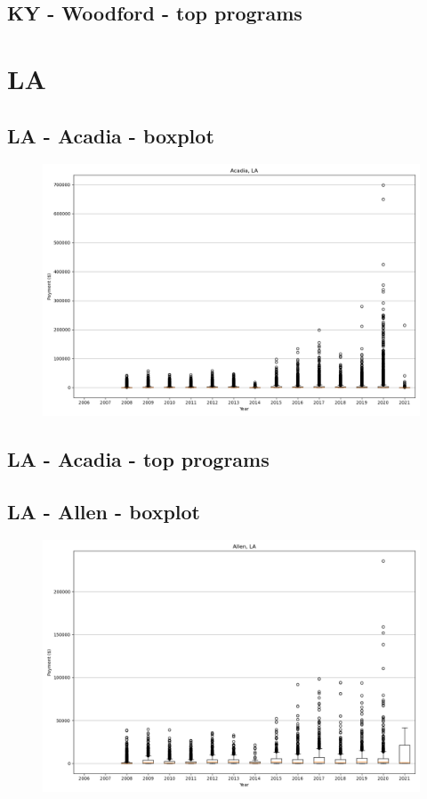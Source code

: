 \subsection*{KY - Woodford - top programs}

\newpage
\section*{LA}
\subsection*{LA - Acadia - boxplot}
\begin{figure}[h]
\centering
\includegraphics[width=7in]{../output/boxplots/counties/Acadia-LA_boxplot.png}
\end{figure}


\subsection*{LA - Acadia - top programs}

\newpage
\subsection*{LA - Allen - boxplot}
\begin{figure}[h]
\centering
\includegraphics[width=7in]{../output/boxplots/counties/Allen-LA_boxplot.png}
\end{figure}


